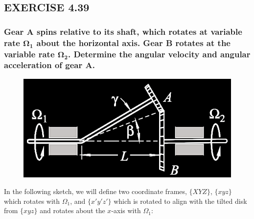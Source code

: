 \documentclass[12pt, letterpaper]{../assignment}
\begin{document}
\subsection*{EXERCISE 4.39}
\subsubsection*{Gear A spins relative to its shaft,
which rotates at variable rate $\bm{\Omega_1}$ about the horizontal axis.
Gear B rotates at the variable rate $\bm{\Omega_2}$.
Determine the angular velocity and angular acceleration of gear A.}

\begin{figure}[H]
    \centering
    \includegraphics[frame]{images/Q4_39.png}
\end{figure}

In the following sketch, we will define two coordinate frames, $\{XYZ\}$,
$\{xyz\}$ which rotates with $\Omega_1$, and $\{x'y'z'\}$ which is rotated to align with the tilted disk from $\{xyz\}$ and rotates about the $x$-axis with $\Omega_1$:
\end{document}
